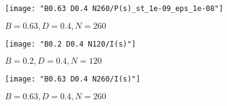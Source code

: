 \documentclass[../thesis.tex]{subfiles}
\begin{document}
\begin{figure}
  \texttt{[image: "B0.63 D0.4 N260/P(s)\_st\_1e-09\_eps\_1e-08"]}  %
  \caption{\(B=0.63, D=0.4, N=260\)}
\label{fig:P(s)-b0.63n260}
\end{figure}

\begin{figure}
  \texttt{[image: "B0.2 D0.4 N120/I(s)"]}  %
  \caption{\(B=0.2, D=0.4, N=120\)}
\label{fig:I(s)-b0.2n120}
\end{figure}

\begin{figure}
  \texttt{[image: "B0.63 D0.4 N260/I(s)"]}  %
  \caption{\(B=0.63, D=0.4, N=260\)}
\label{fig:I(s)-b0.63n260}
\end{figure}
\end{document}
